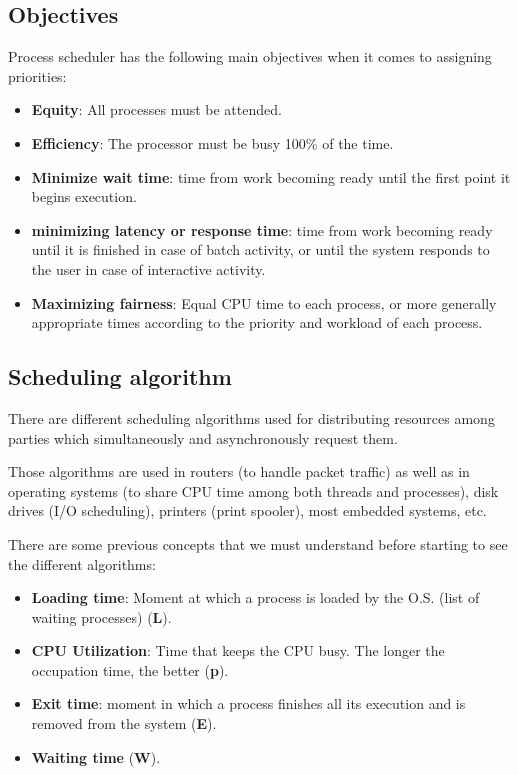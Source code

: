 \subsection{Objectives}

Process scheduler has the following main objectives when it comes to assigning priorities:

\begin{itemize}
    \item \textbf{Equity}: All processes must be attended.

    \item \textbf{Efficiency}: The processor must be busy 100\% of the time.

    \item \textbf{Minimize wait time}: time from work becoming ready until the first point it begins execution.

    \item \textbf{minimizing latency or response time}: time from work becoming ready until it is finished in case of batch activity, or until the system responds to the user in case of interactive activity.

    \item \textbf{Maximizing fairness}: Equal CPU time to each process, or more generally appropriate times according to the priority and workload of each process.
\end{itemize}


\subsection{Scheduling algorithm}

There are different scheduling algorithms used for distributing resources among parties which simultaneously and asynchronously request them.

Those algorithms are used in routers (to handle packet traffic) as well as in operating systems (to share CPU time among both threads and processes), disk drives (I/O scheduling), printers (print spooler), most embedded systems, etc.

There are some previous concepts that we must understand before starting to see the different algorithms:
\begin{itemize}
    \item \textbf{Loading time}: Moment at which a process is loaded by the O.S. (list of waiting processes) (\textbf{L}).

    \item \textbf{CPU Utilization}: Time that keeps the CPU busy. The longer the occupation time, the better (\textbf{p}).

    \item \textbf{Exit time}: moment in which a process finishes all its execution and is removed from the system (\textbf{E}).

    \item \textbf{Waiting time} (\textbf{W}).
\end{itemize}


